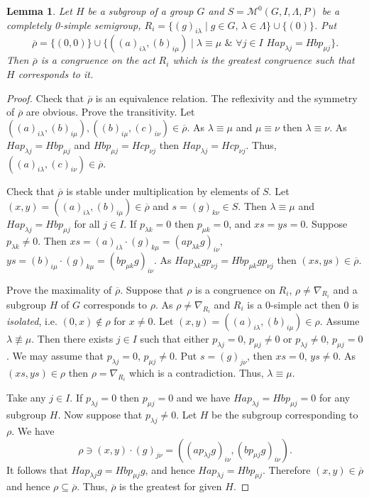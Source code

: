 \documentclass{birkau}
\numberwithin{equation}{section}
\theoremstyle{plain}
\newtheorem{lemma}[theorem]{Lemma}
\theoremstyle{definition}
\begin{document}
    \begin{lemma} \label{lemma:928}
        Let $H$ be a subgroup of a group $G$ and $S=\mathcal M^0 (G, I, \Lambda, P)$ be a completely 0-simple semigroup, $R_i=\{ (g)_{i\lambda} \mid g\in G, \, \lambda \in \Lambda \} \cup \{ (0) \}$. Put $$ \overline\rho = \{(0,0)\}\cup\{((a)_{i \lambda},(b)_{i\mu}) \mid \lambda \equiv \mu\,\, \& \,\,\forall j\in I \,\, Hap_{\lambda j}= Hbp_{\mu j} \}.$$ Then $\overline \rho$ is a congruence on the act $R_i$ which is the greatest congruence such that $H$ corresponds to it.
    \end{lemma}
    \begin{proof}
        Check that $\overline \rho$ is an equivalence relation. The reflexivity and the symmetry of $\overline \rho$ are obvious. Prove the transitivity. Let $((a)_{i\lambda}, (b)_{i\mu}), ((b)_{i\mu}, (c)_{i\nu}) \in \overline \rho$. As $\lambda \equiv \mu$ and $\mu \equiv \nu$ then $\lambda \equiv \nu$. As $Hap_{\lambda j} = Hbp_{\mu j}$ and $Hbp_{\mu j} = Hcp_{\nu j}$ then $Hap_{\lambda j} = Hcp_{\nu j}$. Thus, $((a)_{i\lambda}, (c)_{i\nu}) \in \overline \rho$.

        Check that $\overline \rho$ is stable under multiplication by elements of $S$. Let $(x, y) =  ((a)_{i\lambda}, (b)_{i\mu}) \in \overline \rho$ and $s= (g)_{k\nu} \in S$. Then $\lambda \equiv \mu$ and $Hap_{\lambda j}= Hbp_{\mu j}$ for all $j\in I$. If $p_{\lambda k}=0$ then $p_{\mu k}=0$, and $xs=ys=0$. Suppose $p_{\lambda k} \ne 0$. Then $xs= (a)_{i\lambda} \cdot (g)_{k\mu} = (ap_{\lambda k}g)_{i\nu}$, $ys= (b)_{i\mu} \cdot (g)_{k\mu} = (bp_{\mu k}g)_{i\nu}$. As $Hap_{\lambda k}gp_{\nu j}= Hbp_{\mu k}gp_{\nu j}$ then $(xs, ys)\in \overline \rho$.

        Prove the maximality of $\overline \rho$. Suppose that $\rho$ is a congruence on $R_i$, $\rho \ne \nabla_{R_i}$ and a subgroup $H$ of $G$ corresponds to $\rho$. As $\rho \ne \nabla_{R_i}$ and $R_i$ is a 0-simple act then 0 is {\it isolated}, i.e. $(0, x)\not\in \rho$ for $x\ne 0$. Let $(x, y)=  ((a)_{i\lambda}, (b)_{i\mu}) \in \rho$. Assume $\lambda \not \equiv \mu$. Then there exists $j\in I$ such that either $p_{\lambda j}=0$, $p_{\mu j}\ne 0$ or $p_{\lambda j} \ne 0$, $p_{\mu j}=0$. We may assume that $p_{\lambda j}=0$, $p_{\mu j}\ne 0$. Put $s= (g)_{j\nu}$, then $xs=0$, $ys \ne 0$. As $(xs,ys) \in \rho$ then $\rho=\nabla_{R_i}$ which is a contradiction. Thus, $\lambda \equiv \mu$.

        Take any $j\in I$. If $p_{\lambda j} =0$ then $p_{\mu j}=0$ and we have $Hap_{\lambda j}= Hbp_{\mu j}=0$ for any subgroup $H$. Now suppose that $p_{\lambda j} \ne 0$. Let $H$ be the subgroup corresponding to $\rho$. We have
        $$ \rho \ni (x, y) \cdot (g)_{j\nu} = ((ap_{\lambda j}g)_{i\nu}, (bp_{\mu j}g)_{i\nu}).  $$
        It follows that $Hap_{\lambda j}g = Hbp_{\mu j}g$, and hence $Hap_{\lambda j} = Hbp_{\mu j}$. Therefore $(x,y) \in \overline{\rho}$ and hence $\rho \subseteq \overline \rho$. Thus, $\overline \rho$ is the greatest for given $H$.
    \end{proof}
	
\end{document}
